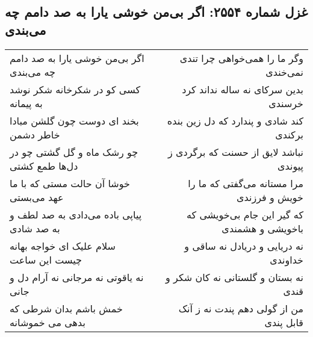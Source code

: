 \begin{center}
\section*{غزل شماره ۲۵۵۴: اگر بی‌من خوشی یارا به صد دامم چه می‌بندی}
\label{sec:2554}
\begin{longtable}{l p{0.5cm} r}
اگر بی‌من خوشی یارا به صد دامم چه می‌بندی
&&
وگر ما را همی‌خواهی چرا تندی نمی‌خندی
\\
کسی کو در شکرخانه شکر نوشد به پیمانه
&&
بدین سرکای نه ساله نداند کرد خرسندی
\\
بخند ای دوست چون گلشن مبادا خاطر دشمن
&&
کند شادی و پندارد که دل زین بنده برکندی
\\
چو رشک ماه و گل گشتی چو در دل‌ها طمع کشتی
&&
نباشد لایق از حسنت که برگردی ز پیوندی
\\
خوشا آن حالت مستی که با ما عهد می‌بستی
&&
مرا مستانه می‌گفتی که ما را خویش و فرزندی
\\
پیاپی باده می‌دادی به صد لطف و به صد شادی
&&
که گیر این جام بی‌خویشی که باخویشی و هشمندی
\\
سلام علیک ای خواجه بهانه چیست این ساعت
&&
نه دریایی و دریادل نه ساقی و خداوندی
\\
نه یاقوتی نه مرجانی نه آرام دل و جانی
&&
نه بستان و گلستانی نه کان شکر و قندی
\\
خمش باشم بدان شرطی که بدهی می خموشانه
&&
من از گولی دهم پندت نه ز آنک قابل پندی
\\
\end{longtable}
\end{center}
